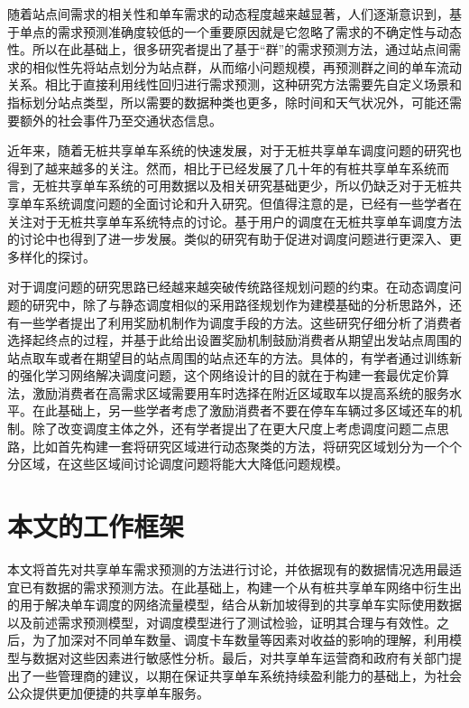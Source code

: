 \documentclass[]{tongjithesis}
\numberwithin{equation}{chapter}
\begin{document}
随着站点间需求的相关性和单车需求的动态程度越来越显著，人们逐渐意识到，基于单点的需求预测准确度较低的一个重要原因就是它忽略了需求的不确定性与动态性。所以在此基础上，很多研究者提出了基于“群”的需求预测方法\cite{chen2016dynamic,hulot2018towards}，通过站点间需求的相似性先将站点划分为站点群，从而缩小问题规模，再预测群之间的单车流动关系。相比于直接利用线性回归进行需求预测，这种研究方法需要先自定义场景和指标划分站点类型，所以需要的数据种类也更多，除时间和天气状况外，可能还需要额外的社会事件乃至交通状态信息。

近年来，随着无桩共享单车系统的快速发展，对于无桩共享单车调度问题的研究也得到了越来越多的关注。然而，相比于已经发展了几十年的有桩共享单车系统而言，无桩共享单车系统的可用数据以及相关研究基础更少，所以仍缺乏对于无桩共享单车系统调度问题的全面讨论和升入研究。但值得注意的是，已经有一些学者在关注对于无桩共享单车系统特点的讨论\cite{shen2018understanding,li2019operating,xing2020exploring}。基于用户的调度在无桩共享单车调度方法的讨论中也得到了进一步发展。类似的研究有助于促进对调度问题进行更深入、更多样化的探讨。

对于调度问题的研究思路已经越来越突破传统路径规划问题的约束。在动态调度问题的研究中，除了与静态调度相似的采用路径规划作为建模基础的分析思路外，还有一些学者提出了利用奖励机制作为调度手段的方法\cite{fricker2016incentives,ghosh2017incentivizing}。这些研究仔细分析了消费者选择起终点的过程，并基于此给出设置奖励机制鼓励消费者从期望出发站点周围的站点取车或者在期望目的站点周围的站点还车的方法。具体的，有学者通过训练新的强化学习网络解决调度问题，这个网络设计的目的就在于构建一套最优定价算法，激励消费者在高需求区域需要用车时选择在附近区域取车以提高系统的服务水平\cite{pan2019deep}。在此基础上，另一些学者考虑了激励消费者不要在停车车辆过多区域还车的机制\cite{duan2019optimizing,ji2020does}。除了改变调度主体之外，还有学者提出了在更大尺度上考虑调度问题二点思路，比如首先构建一套将研究区域进行动态聚类的方法，将研究区域划分为一个个分区域，在这些区域间讨论调度问题将能大大降低问题规模\cite{caggiani2017dynamic}。

\section{本文的工作框架}
本文将首先对共享单车需求预测的方法进行讨论，并依据现有的数据情况选用最适宜已有数据的需求预测方法。在此基础上，构建一个从有桩共享单车网络中衍生出的用于解决单车调度的网络流量模型，结合从新加坡得到的共享单车实际使用数据以及前述需求预测模型，对调度模型进行了测试检验，证明其合理与有效性。之后，为了加深对不同单车数量、调度卡车数量等因素对收益的影响的理解，利用模型与数据对这些因素进行敏感性分析。最后，对共享单车运营商和政府有关部门提出了一些管理商的建议，以期在保证共享单车系统持续盈利能力的基础上，为社会公众提供更加便捷的共享单车服务。
\end{document}
